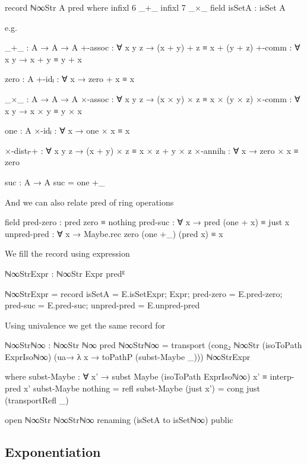 \begin{code}[hide]
record ℕ∞Str A pred where
  infixl 6 _+_
  infixl 7 _×_
  field
    isSetA : isSet A
\end{code}
e.g.
\begin{code}
    _+_ : A → A → A
    +-assoc : ∀ x y z → (x + y) + z ≡ x + (y + z)
    +-comm : ∀ x y → x + y ≡ y + x
\end{code}
\begin{code}[hide]
    zero : A
    +-idₗ : ∀ x → zero + x ≡ x

    _×_ : A → A → A
    ×-assoc : ∀ x y z → (x × y) × z ≡ x × (y × z)
    ×-comm : ∀ x y → x × y ≡ y × x

    one : A
    ×-idₗ : ∀ x → one × x ≡ x

    ×-distₗ-+ : ∀ x y z → (x + y) × z ≡ x × z + y × z
    ×-annihₗ : ∀ x → zero × x ≡ zero

  suc : A → A
  suc = one +_
\end{code}
And we can also relate pred of ring operations
\begin{code}
  field
    pred-zero : pred zero ≡ nothing
    pred-suc : ∀ x → pred (one + x) ≡ just x
    unpred-pred : ∀ x → Maybe.rec zero (one +_) (pred x) ≡ x
\end{code}
We fill the record using expression
\begin{code}
ℕ∞StrExpr : ℕ∞Str Expr predᴱ
\end{code}
\begin{code}[hide]
ℕ∞StrExpr =
  record
    { isSetA = E.isSetExpr;
      Expr;
      pred-zero = E.pred-zero;
      pred-suc = E.pred-suc;
      unpred-pred = E.unpred-pred }
\end{code}
Using univalence we get the same record for 
\begin{code}
ℕ∞Strℕ∞ : ℕ∞Str ℕ∞ pred
ℕ∞Strℕ∞ =
  transport
    (cong₂ ℕ∞Str
      (isoToPath ExprIsoℕ∞)
      (ua→ λ x → toPathP (subst-Maybe _)))
    ℕ∞StrExpr
\end{code}
\begin{code}[hide]
  where
  subst-Maybe :
    ∀ x' → subst Maybe (isoToPath ExprIsoℕ∞) x' ≡ interp-pred x'
  subst-Maybe nothing = refl
  subst-Maybe (just x') = cong just (transportRefl _)

open ℕ∞Str ℕ∞Strℕ∞ renaming (isSetA to isSetℕ∞) public
\end{code}

\subsection{Exponentiation}

